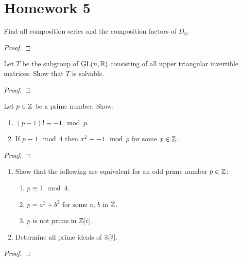 \chapter{Homework 5}
\begin{problem}
Find all composition series and the composition factors of $D_6$.
\end{problem}
\begin{proof}
\end{proof}

\begin{problem}
Let $T$ be the subgroup of $\mathrm{GL}(n,\mathbb{R})$ consisting of all upper triangular
invertible matrices. Show that $T$ is solvable.
\end{problem}
\begin{proof}
\end{proof}

\begin{problem}
Let $p\in\mathbb{Z}$ be a prime number. Show:
\begin{enumerate}[label=(\alph*)]
\item $(p-1)!\equiv -1\mod{p}$.
\item If $p\equiv 1\mod{4}$ then $x^2\equiv -1\mod{p}$ for some
  $x\in\mathbb{Z}$.
\end{enumerate}
\end{problem}
\begin{proof}
\end{proof}

\begin{problem}
\begin{enumerate}[label=(\alph*)]
\item Show that the following are equivalent for an odd prime number
  $p\in\mathbb{Z}$:
  \begin{enumerate}[label=(\roman*)]
  \item $p\equiv 1\mod 4$.
  \item $p=a^2+b^2$ for some $a$, $b$ in $\mathbb{Z}$.
  \item $p$ is not prime in $\mathbb{Z}[i]$.
  \end{enumerate}
\item Determine all prime ideals of $\mathbb{Z}[i]$.
\end{enumerate}
\end{problem}
\begin{proof}
\end{proof}

